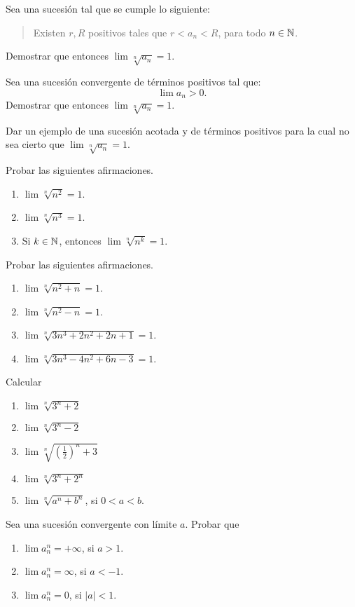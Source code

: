 
\item Sea \sucan una sucesión tal que se cumple lo siguiente:
\begin{quote}
Existen $r,R$ positivos tales que $r < a_n < R$, para todo $n\in\mathbb{N}$.
\end{quote}
Demostrar que entonces $\lim \sqrt[n]{a_n} = 1$. 

\item Sea \sucan una sucesión convergente de términos positivos tal que:
\[
\lim a_n > 0.
\]
Demostrar que entonces $\lim \sqrt[n]{a_n} = 1$. 

\item Dar un ejemplo de una sucesión \sucan acotada y de términos positivos para la cual no sea cierto que $\lim \sqrt[n]{a_n} = 1$. 

\item Probar las siguientes afirmaciones.
\begin{enumerate}
    \item $\lim  \sqrt[n]{n^2} = 1$.
    \item $\lim  \sqrt[n]{n^3} = 1$.
    \item Si $k\in\mathbb{N}$, entonces $\lim \sqrt[n]{n^k} = 1$.
\end{enumerate}

\item Probar las siguientes afirmaciones.
\begin{enumerate}
    \item $\lim \sqrt[n]{n^2+n} = 1$.
    \item $\lim \sqrt[n]{n^2-n} = 1$.
    \item $\lim \sqrt[n]{3n^3+2n^2+2n+1} = 1$.
    \item $\lim \sqrt[n]{3n^3-4n^2+6n-3} = 1$.
\end{enumerate}

\item Calcular
\begin{enumerate}
    \item $\lim \sqrt[n]{3^n+2}$
    \item $\lim \sqrt[n]{3^n-2}$
    \item $\lim \sqrt[n]{(\frac12)^n+3}$
    \item $\lim \sqrt[n]{3^n+2^n}$
    \item $\lim \sqrt[n]{a^n+b^n}$, si $0 < a < b$.
\end{enumerate}

\item Sea \sucan una sucesión convergente con límite $a$.
Probar que
\begin{enumerate}
    \item $\lim a_n^n = +\infty$, si $a>1$.
    \item $\lim a_n^n = \infty$, si $a<-1$.
    \item $\lim a_n^n = 0$, si $|a|<1$.
\end{enumerate}